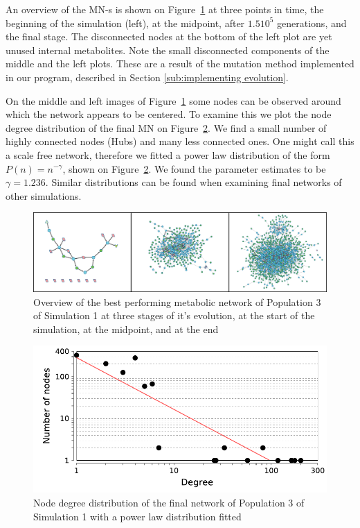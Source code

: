 \documentclass[10pt,a4paper]{article}
\begin{document}
An overview of the MN-s is shown on Figure~\ref{fig:init-mid-final} at three points in time, the beginning of the simulation (left), at the midpoint, after $1.5 10^5$ generations, and the final stage. The disconnected nodes at the bottom of the left plot are yet unused internal metabolites. Note the small disconnected components of the middle and the left plots. These are a result of the mutation method implemented in our program, described in Section \ref{sub:implementing evolution}. 

On the middle and left images of Figure~\ref{fig:init-mid-final} some nodes can be observed around which the network appears to be centered. To examine this we plot the node degree distribution of the final MN on Figure~\ref{fig:nodedegreedistro}. We find a small number of highly connected nodes (Hubs) and many less connected ones. One might call this a scale free network, therefore we fitted a power law distribution of the form $P(n)=n^{-\gamma}$, shown on Figure~\ref{fig:nodedegreedistro}. We found the parameter estimates to be $\gamma=1.236$. Similar distributions can be found when examining final networks of other simulations. 



\begin{figure}[htpb]
	\centering
	\includegraphics[width=1\linewidth]{init-mid-final.png}
	\caption{Overview of the best performing metabolic network of Population 3 of Simulation 1 at three stages of it's evolution, at the start of the simulation, at the midpoint, and at the end}
	\label{fig:init-mid-final}
\end{figure}


\begin{figure}[htpb]
	\centering
	\includegraphics[width=0.8\linewidth]{nodedegreedistro.pdf}
	\caption{Node degree distribution of the final network of Population 3 of Simulation 1 with a power law distribution fitted}
	\label{fig:nodedegreedistro}
\end{figure}
\end{document}
